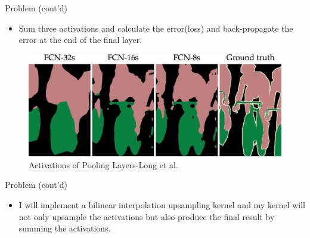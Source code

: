 \documentclass{beamer}
\begin{document}
	\begin{frame}{Problem (cont'd)}
		\begin{itemize}
			\item \justifying Sum three activations and calculate the error(loss) and back-propagate the error at the end of the final layer.
		\end{itemize}
		\begin{figure}
			\includegraphics[scale=0.15]{./Figures/fcn_output.jpg}
			\caption{\label{fig:fcn_output}Activations of Pooling Layers-Long et al.\cite{long2015fully}}
		\end{figure}
	\end{frame}
	\begin{frame}{Problem (cont'd)}
		\begin{itemize}
			\item I will implement a bilinear interpolation upsampling kernel and my kernel will not only upsample the activations but also produce the final result by summing the activations.
		\end{itemize}
	\end{frame}
	
\end{document}
